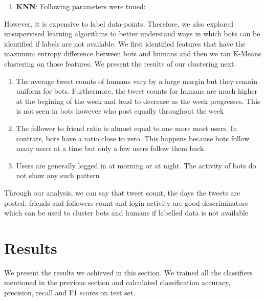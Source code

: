 \documentclass[journal]{IEEEtran}
\begin{document}
\begin{enumerate}
\item \textbf{KNN}: Following parameters were tuned:

\end{enumerate}

However, it is expensive to label data-points. Therefore, we also explored unsupervised learning algorithms to better understand ways in which bots can be identified if labels are not available. We first identified features that have the maximum entropy difference between bots and humans and then we ran K-Means clustering on those features. We present the results of our clustering next.

\begin{enumerate}
	\item The average tweet counts of humans vary by a large margin but they remain uniform for bots. Furthermore, the tweet counts for humans are much higher at the begining of the week and tend to decrease as the week progresses. This is not seen in bots however who post equally throughout the week
	\item The follower to friend ratio is almost equal to one more most users. In contrats, bots have a ratio close to zero. This happens because bots follow many users at a time but only a few users follow them back.
	\item Users are generally logged in at morning or at night. The activity of bots do not show any such pattern
\end{enumerate}

Through our analysis, we can say that tweet count, the days the tweets are posted, friends and followers count and login activity are good descriminators which can be used to cluster bots and humans if labelled data is not available


\section{Results}
We present the results we achieved in this section. We trained all the classifiers mentioned in the previous section and calculated classification accuracy, precision, recall and F1 scores on test set. 
\end{document}
